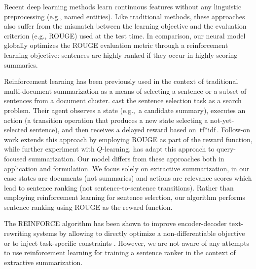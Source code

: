 \documentclass[11pt,a4paper]{article}
\begin{document}
Recent deep learning methods
\cite{krageback-cvsc14,Yin-ijcai15,jp-acl16,nallapati17} learn
continuous features without any linguistic preprocessing (e.g., named
entities). Like traditional methods, these approaches also suffer from
the mismatch between the learning objective and the evaluation
criterion (e.g., ROUGE) used at the test time.  In comparison, our
neural model globally optimizes the ROUGE evaluation metric through a
reinforcement learning objective: sentences are highly ranked if they
occur in highly scoring summaries.




Reinforcement learning has been previously used in the context of
traditional multi-document summarization as a means of selecting a
sentence or a subset of sentences from a document
cluster.  cast the sentence selection task as a
search problem. Their agent observes a state (e.g.,~a candidate
summary), executes an action (a transition operation that produces a
new state selecting a not-yet-selected sentence), and then receives a
delayed reward based on $\mbox{tf}*\mbox{idf}$. Follow-on work
\cite{Rioux:emnlp14} extends this approach by employing ROUGE as part
of the reward function, while  further experiment
with \mbox{$Q$-learning}.  has adapt
this approach to query-focused summarization. Our model differs from
these approaches both in application and formulation. We focus solely
on extractive summarization, in our case states are documents (not
summaries) and actions are relevance scores which lead to sentence
ranking (not sentence-to-sentence transitions). Rather than employing
reinforcement learning for sentence selection, our algorithm performs
sentence ranking using ROUGE as the reward function.





The REINFORCE algorithm \cite{Williams:1992} has been shown to improve
encoder-decoder text-rewriting systems by allowing to directly
optimize a non-differentiable objective
\cite{ranzato-arxiv15-bias,li-emnlp-16,paulus-socher-arxiv17} or to
inject task-specific constraints
\cite{xingxing-arxiv-17,nogueira-cho:2017:EMNLP2017}. However, we are
not aware of any attempts to use reinforcement learning for training a
sentence ranker in the context of extractive summarization. 
\end{document}
